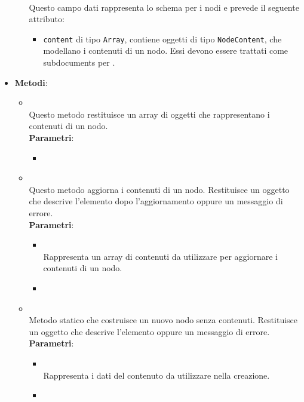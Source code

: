 \begin{itemize}
\begin{itemize}
\\ Questo campo dati rappresenta lo schema  per i nodi e prevede il seguente attributo:
\begin{itemize}
\item \texttt{content} di tipo \texttt{Array}, contiene oggetti di tipo \texttt{NodeContent}, che modellano i contenuti di un nodo. Essi devono essere trattati come subdocuments per .
\end{itemize}
\end{itemize}
\item \textbf{Metodi}:
\begin{itemize}
\item {}
\\ Questo metodo restituisce un array di oggetti  che rappresentano i contenuti di un nodo.
\\ \textbf{Parametri}:
\begin{itemize}
\item {}
\\ \dpCallback
\end{itemize}
\item {}
\\ Questo metodo aggiorna i contenuti di un nodo. Restituisce un oggetto  che descrive l’elemento dopo l’aggiornamento oppure un messaggio di errore.
\\ \textbf{Parametri}:
\begin{itemize}
\item {}
\\ Rappresenta un array di contenuti da utilizzare per aggiornare i contenuti di un nodo.
\item {}
\\ \dpCallback
\end{itemize}
\item {}
\\ Metodo statico che costruisce un nuovo nodo senza contenuti. Restituisce un oggetto  che descrive l’elemento oppure un messaggio di errore.
\\ \textbf{Parametri}:
\begin{itemize}
\item {}
\\ Rappresenta i dati del contenuto da utilizzare nella creazione.
\item {}
\\ \dpCallback
\end{itemize}
\end{itemize}
\end{itemize}
